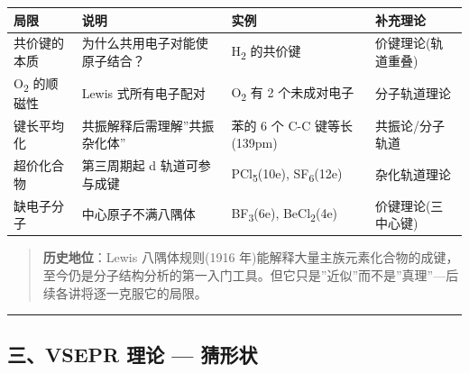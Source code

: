 \documentclass[a4paper,11pt]{ctexart}
\newcounter{none}
\newcommand{\箭}{\ensuremath{\rightarrow}}
\newcommand{\左箭}{\ensuremath{\leftarrow}}
\newcommand{\上箭}{\ensuremath{\uparrow}}
\newcommand{\下箭}{\ensuremath{\downarrow}}
\newcommand{\衡}{\ensuremath{\rightleftharpoons}}
\newcommand{\双箭}{\ensuremath{\leftrightarrow}}
\newcommand{\约等于}{\ensuremath{\approx}}
\newcommand{\小于等于}{\ensuremath{\leq}}
\newcommand{\大于等于}{\ensuremath{\geq}}
\newcommand{\不等于}{\ensuremath{\neq}}
\newcommand{\西格马}{\ensuremath{\sigma}}
\newcommand{\派}{\ensuremath{\pi}}
\begin{document}
{\def\LTcaptype{none} %
\begin{longtable}[]{@{}
  >{\raggedright\arraybackslash}p{}
  >{\raggedright\arraybackslash}p{}
  >{\raggedright\arraybackslash}p{}
  >{\centering\arraybackslash}p{}@{}}
\toprule\noalign{}
\begin{minipage}[b]{\linewidth}\raggedright
局限
\end{minipage} & \begin{minipage}[b]{\linewidth}\raggedright
说明
\end{minipage} & \begin{minipage}[b]{\linewidth}\raggedright
实例
\end{minipage} & \begin{minipage}[b]{\linewidth}\centering
补充理论
\end{minipage} \\
\midrule\noalign{}
\endhead
\bottomrule\noalign{}
\endlastfoot
共价键的本质 & 为什么共用电子对能使原子结合？ & H\textsubscript{2} 的共价键 & 价键理论(轨道重叠) \\
O\textsubscript{2} 的顺磁性 & Lewis 式所有电子配对 & O\textsubscript{2} 有 2 个未成对电子 & 分子轨道理论 \\
键长平均化 & 共振解释后需理解''共振杂化体'' & 苯的 6 个 C-C 键等长(139pm) & 共振论/分子轨道 \\
超价化合物 & 第三周期起 d 轨道可参与成键 & PCl\textsubscript{5}(10e), SF\textsubscript{6}(12e) & 杂化轨道理论 \\
缺电子分子 & 中心原子不满八隅体 & BF\textsubscript{3}(6e), BeCl\textsubscript{2}(4e) & 价键理论(三中心键) \\
\end{longtable}
}

\begin{quote}
\textbf{历史地位}：Lewis 八隅体规则(1916 年)能解释大量主族元素化合物的成键，至今仍是分子结构分析的第一入门工具。但它只是''近似''而不是''真理''---后续各讲将逐一克服它的局限。
\end{quote}

\begin{center}\rule{0.5\linewidth}{0.5pt}\end{center}

\subsection{三、VSEPR 理论 --- 猜形状}\label{ux4e09vsepr-ux7406ux8bba-ux731cux5f62ux72b6}
\end{document}

